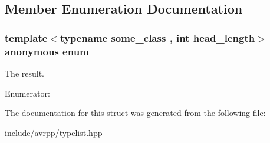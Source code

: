 \subsection{Member Enumeration Documentation}
\hypertarget{structavrpp_1_1typelist_1_1get__index_3_01null__list_00_01some__class_00_01head__length_01_4_a820fc2073360457cbb29ecd957245b51}{
\subsubsection[{"@32}]{\setlength{\rightskip}{0pt plus 5cm}template$<$typename some\_\-class , int head\_\-length$>$ anonymous enum}}
\label{structavrpp_1_1typelist_1_1get__index_3_01null__list_00_01some__class_00_01head__length_01_4_a820fc2073360457cbb29ecd957245b51}


The result. 

\begin{Desc}
\item[Enumerator: ]\par
\begin{description}
\item[{\em 
\hypertarget{structavrpp_1_1typelist_1_1get__index_3_01null__list_00_01some__class_00_01head__length_01_4_a820fc2073360457cbb29ecd957245b51a2275fc664d462435f1e663681fb75ee4}{
result}
\label{structavrpp_1_1typelist_1_1get__index_3_01null__list_00_01some__class_00_01head__length_01_4_a820fc2073360457cbb29ecd957245b51a2275fc664d462435f1e663681fb75ee4}
}]\end{description}
\end{Desc}



The documentation for this struct was generated from the following file:\begin{DoxyCompactItemize}
\item 
include/avrpp/\hyperlink{typelist_8hpp}{typelist.hpp}\end{DoxyCompactItemize}
